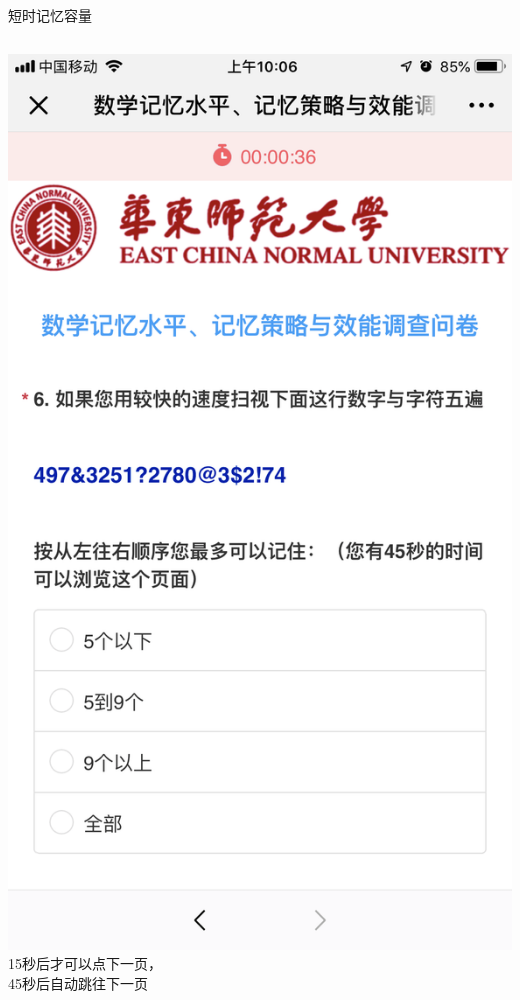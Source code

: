 \documentclass[serif]{beamer}
\begin{document}
    \begin{frame}{短时记忆容量}
    \begin{columns}
    	\includegraphics[scale=0.08]{test6.png}\\
    	\scriptsize{15秒后才可以点下一页，}\\
    	\scriptsize{45秒后自动跳往下一页}

\end{columns}
\end{frame}
\end{document}
